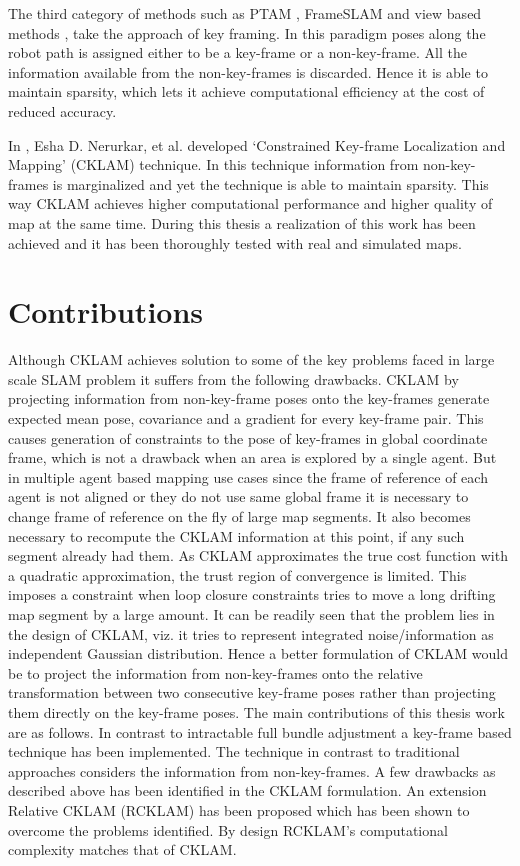 The third category of methods such as PTAM \cite{klein07parallel}, FrameSLAM \cite{4648456} and view based methods \cite {Konolige01072010, 6630556}, take the approach of key framing. In this paradigm poses along the robot path is assigned either to be a key-frame or a non-key-frame. All the information available from the non-key-frames is discarded. Hence it is able to maintain sparsity, which lets it achieve computational efficiency at the cost of reduced accuracy. 

In \cite{CKLAM}, Esha D. Nerurkar, et al. developed `Constrained Key-frame Localization and Mapping' (CKLAM) technique. In this technique information from non-key-frames is marginalized and yet the technique is able to maintain sparsity. This way CKLAM achieves higher computational performance and higher quality of map at the same time. During this thesis a realization of this work has been achieved and it has been thoroughly tested with real and simulated maps. 

\section{Contributions}
Although CKLAM achieves solution to some of the key problems faced in large scale SLAM problem it suffers from the following drawbacks. CKLAM by projecting information from non-key-frame poses onto the key-frames generate expected mean pose, covariance and a gradient for every key-frame pair. This causes generation of constraints to the pose of key-frames in global coordinate frame, which is not a drawback when an area is explored by a single agent. But in multiple agent based mapping use cases since the frame of reference of each agent is not aligned or they do not use same global frame it is necessary to change frame of reference on the fly of large map segments. It also becomes necessary to recompute the CKLAM information at this point, if any such segment already had them. As CKLAM approximates the true cost function with a quadratic approximation, the trust region of convergence is limited. This imposes a constraint when loop closure constraints tries to move a long drifting map segment by a large amount. It can be readily seen that the problem lies in the design of CKLAM, viz. it tries to represent integrated noise/information as independent Gaussian distribution. Hence a better formulation of CKLAM would be to project the information from non-key-frames onto the relative transformation between two consecutive key-frame poses rather than projecting them directly on the key-frame poses. The main contributions of this thesis work are as follows. In contrast to intractable full bundle adjustment a key-frame based technique has been implemented. The technique in contrast to traditional approaches considers the information from non-key-frames. A few drawbacks as described above has been identified in the CKLAM formulation. An extension Relative CKLAM (RCKLAM) has been proposed which has been shown to overcome the problems identified. By design RCKLAM's computational complexity matches that of CKLAM. 

